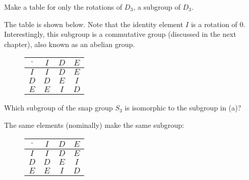 \documentclass[../key.tex]{subfiles}
\begin{document}
\begin{outer_problem}
\item
\begin{inner_problem}[start=1,leftmargin=25pt]
	\item Make a table for only the rotations of $D_3$, a subgroup of $D_3$.
\end{inner_problem}
\end{outer_problem}

\noindent The table is shown below. Note that the identity element $I$ is a rotation of $0$. Interestingly, this subgroup is a commutative group (discussed in the next chapter), also known as an abelian group.

\begin{figure}[H]
	\begin{center}
		\begin{minipage}[b]{\textwidth}
			\centering
			\begin{tabular}{c|ccc}
				\hline
				$\cdot$ & $I$ & $D$ & $E$ \\ \hline
				\rowcolor{light-gray}
				$I$ & $I$ & $D$ & $E$ \\
				$D$ & $D$ & $E$ & $I$ \\
				\rowcolor{light-gray}
				$E$ & $E$ & $I$ & $D$ \\ \hline
			\end{tabular}
			\vspace*{0.5\baselineskip}
		\end{minipage}
	\end{center}
	\vspace*{-2\baselineskip}
\end{figure}

\begin{inner_problem}
\item Which subgroup of the snap group $S_3$ is isomorphic to the subgroup in (a)?
\end{inner_problem}

\noindent The same elements (nominally) make the same subgroup:

\begin{figure}[H]
	\begin{center}
		\begin{minipage}[b]{\textwidth}
			\centering
			\begin{tabular}{c|ccc}
				\hline
				$\cdot$ & $I$ & $D$ & $E$ \\ \hline
				\rowcolor{light-gray}
				$I$ & $I$ & $D$ & $E$ \\
				$D$ & $D$ & $E$ & $I$ \\
				\rowcolor{light-gray}
				$E$ & $E$ & $I$ & $D$ \\ \hline
			\end{tabular}
			\vspace*{0.5\baselineskip}
		\end{minipage}
	\end{center}
	\vspace*{-2\baselineskip}
\end{figure}
\end{document}
